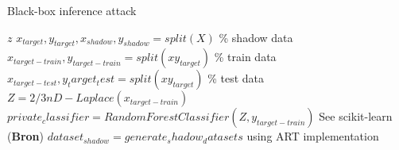\begin{algorithm}[H]
  \caption{Black-box inference attack}\label{alg:shokri-mi}
  \begin{algorithmic}
    \Ensure $z$
    \State $x_{target}, y_{target}, x_{shadow}, y_{shadow} = split(X)$ \% shadow data
    \State $x_{target-train}, y_{target-train} = split(xy_{target})$ \% train data
    \State $x_{target-test}, y_target_test = split(xy_{target})$ \% test data
    \State $Z = 2/3nD-Laplace(x_{target-train})$ 
    \State $private_classifier = RandomForestClassifier(Z, y_{target-train})$ \Comment See scikit-learn (\textbf{Bron})
      \State $dataset_{shadow} = generate_shadow_datasets$ \Comment using ART implementation
    \EndFor

  \end{algorithmic}
\end{algorithm}